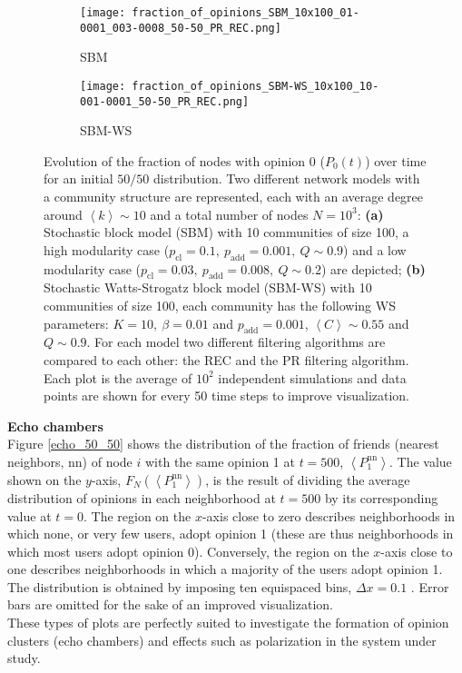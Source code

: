 \documentclass[11 pt , letterpaper , twoside , openright]{book}
\begin{document}
\begin{figure}[H]
  \begin{subfigure}[b]{0.49\textwidth}
    \texttt{[image: fraction\_of\_opinions\_SBM\_10x100\_01-0001\_003-0008\_50-50\_PR\_REC.png]}
    \caption{SBM}
    \label{sbm_50-50}
  \end{subfigure}
  \begin{subfigure}[b]{0.49\textwidth}
    \texttt{[image: fraction\_of\_opinions\_SBM-WS\_10x100\_10-001-0001\_50-50\_PR\_REC.png]}
    \caption{SBM-WS}
    \label{sbm-ws_50-50}
  \end{subfigure}
  \captionsetup{format=plain}
  \caption[Evolution of the fraction of nodes with opinion 0 ($P_0(t)$) over time for an initial $50/50$ opinion distribution.]{Evolution of the fraction of nodes with opinion 0 ($P_0(t)$) over time for an initial $50/50$ distribution. Two different network models with a community structure are represented, each with an average degree around $\left<k\right> \sim 10$ and a total number of nodes $N = 10^3$: \textbf{(a)} Stochastic block model (SBM) with 10 communities of size 100, a high modularity case ($p_{\text{cl}} = 0.1,\ p_{\text{add}} = 0.001,\ Q \sim 0.9$) and a low modularity case ($p_{\text{cl}} = 0.03,\ p_{\text{add}} = 0.008,\ Q \sim 0.2$) are depicted; \textbf{(b)} Stochastic Watts-Strogatz block model (SBM-WS) with 10 communities of size 100, each community has the following WS parameters: $K = 10,\ \beta = 0.01$ and $p_{\text{add}} = 0.001$, $\left<C\right> \sim 0.55$ and $Q \sim 0.9$. For each model two different filtering algorithms are compared to each other: the REC and the PR filtering algorithm. Each plot is the average of $10^2$ independent simulations and data points are shown for every 50 time steps to improve visualization.}
\label{ev_op_50_50}
\end{figure}
\noindent
\textbf{Echo chambers}\\
\newline
Figure \ref{echo_50_50} shows the distribution of the fraction of friends (nearest neighbors, nn) of node $i$ with the same opinion 1 at $t=500$, $\left<P_1^{\text{nn}}\right>$. The value shown on the $y$-axis, $F_N(\left<P_1^{\text{nn}}\right>)$, is the result of dividing the average distribution of opinions in each neighborhood at $t=500$ by its corresponding value at $t=0$. The region on the $x$-axis close to zero describes neighborhoods in which none, or very few users, adopt opinion 1 (these are thus neighborhoods in which most users adopt opinion 0). Conversely, the region on the $x$-axis close to one describes neighborhoods in which a majority of the users adopt opinion 1. The distribution is obtained by imposing ten equispaced bins, $\Delta x = 0.1$ \cite{Perra2019}. Error bars are omitted for the sake of an improved visualization.\\
These types of plots are perfectly suited to investigate the formation of opinion clusters (echo chambers) and effects such as polarization in the system under study.\\
\end{document}
